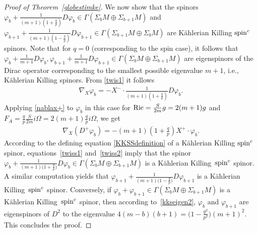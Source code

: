 \documentclass[pdftex]{sigma}
\numberwithin{equation}{section}
\theoremstyle{definition}
\begin{document}
\begin{proof}[Proof of Theorem~\ref{globestimke}]
We now show that the spinors $\varphi_{b}+\frac{1}{(m+1)\left(1+\frac{q}{p}\right)}D\varphi_{b}\in\Gamma(\Sigma_{b} M\oplus \Sigma_{b+1} M)$ and $\varphi_{b+1}+\frac{1}{(m+1)\left(1-\frac{q}{p}\right)}D\varphi_{b+1}\in\Gamma(\Sigma_{b+1} M\oplus \Sigma_{b} M)$ are K\"ahlerian Killing  ${\mathop{\rm spin}^c}$ spinors. Note that for $q=0$ (corresponding to the spin case), it follows that $\varphi_{b}+\frac{1}{m+1}D\varphi_{b}, \varphi_{b+1}+\frac{1}{m+1}D\varphi_{b+1}\in\Gamma(\Sigma_{b} M\oplus \Sigma_{b+1} M)$ are eigenspinors of the Dirac operator corresponding to the smallest possible eigenvalue $m+1$, i.e., K\"ahlerian Killing spinors. From \eqref{twis1} it follows
\begin{gather}\label{twiss1}
\nabla_X \varphi_{b}=-X^-\cdot \frac{1}{(m+1)\left(1+\frac{q}{p}\right)} D\varphi_{b}.
\end{gather}
Applying \eqref{nablax+}  to $\varphi_{b}$ in this case for ${\mathop{\rm Ric}}=\frac{S}{2m}g=2(m+1)g$ and $F_A=\frac{q}{p}\frac{S}{2m}i\Omega=2(m+1)\frac{q}{p}i\Omega$, we get
\begin{gather}\label{twiss2}
\nabla_X (D^+\varphi_{b})=-(m+1)\left(1+\frac{q}{p}\right)X^+\cdot \varphi_{b}.
\end{gather}
 According to the def\/ining  equation \eqref{KKSSdefinition} of a K\"ahlerian Killing ${\mathop{\rm spin}^c}$ spinor, equa\-tions~\eqref{twiss1} and~\eqref{twiss2} imply that the spinor $\varphi_{b}+\frac{1}{(m+1)\big(1+\frac{q}{p}\big)}D\varphi_{b}\in\Gamma(\Sigma_{b} M\oplus \Sigma_{b+1} M)$ is a  K\"ahlerian Killing~${\mathop{\rm spin}^c}$ spinor. A similar computation yields that $\varphi_{b+1}+\frac{1}{(m+1)\big(1-\frac{q}{p}\big)}D\varphi_{b+1}$ is a K\"ahlerian Killing~${\mathop{\rm spin}^c}$  spinor.  Conversely, if $\varphi_{b}+\varphi_{b+1}\in \Gamma(\Sigma_{b}M\oplus \Sigma_{b+1} M)$ is a K\"ahlerian Killing~${\mathop{\rm spin}^c}$ spinor, then according to~\eqref{kkseigen2}, $\varphi_{b}$ and $\varphi_{b+1}$ are eigenspinors of $D^2$ to the eigenvalue $4(m-b)(b+1)=\big(1-\frac{q^2}{p^2}\big)(m+1)^2$. This concludes the proof.
\end{proof}
\end{document}
